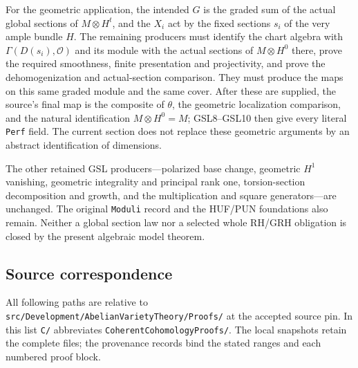 \documentclass[11pt,a4paper]{article}
\numberwithin{equation}{section}
\theoremstyle{remark}\newtheorem{remark}[theorem]{Remark}
\begin{document}
For the geometric application, the intended $G$ is the graded sum of
the actual global sections of $M\otimes H^t$, and the $X_i$ act by
the fixed sections $s_i$ of the very ample bundle $H$.
The remaining producers must identify the chart algebra with
$\Gamma(D(s_i),\mathcal O)$ and its module with the actual
sections of $M\otimes H^0$ there, prove the required smoothness,
finite presentation and projectivity, and prove the dehomogenization
and actual-section comparison.  They must produce the maps on this
same graded module and the same cover.  After these are supplied,
the source's final map is the composite of $\theta$, the geometric
localization comparison, and the natural identification
$M\otimes H^0=M$; GSL8--GSL10 then give every literal
\texttt{Perf} field.  The current section does not replace these
geometric arguments by an abstract identification of dimensions.

The other retained GSL producers---polarized base change, geometric
$H^1$ vanishing, geometric integrality and principal rank one,
torsion-section decomposition and growth, and the multiplication
and square generators---are unchanged.  The original \texttt{Moduli}
record and the HUF/PUN foundations also remain.  Neither a global
section law nor a selected whole RH/GRH obligation is closed by the
present algebraic model theorem.

\subsection{Source correspondence}

All following paths are relative to
\texttt{src/\allowbreak Development/\allowbreak Abelian\allowbreak Variety\allowbreak Theory/\allowbreak Proofs/\allowbreak } at the
accepted source pin.  In this list \texttt{C/\allowbreak } abbreviates
\texttt{Coherent\allowbreak Cohomology\allowbreak Proofs/\allowbreak }.  The local snapshots retain the
complete files; the provenance records bind the stated ranges and
each numbered proof block.
\end{document}
